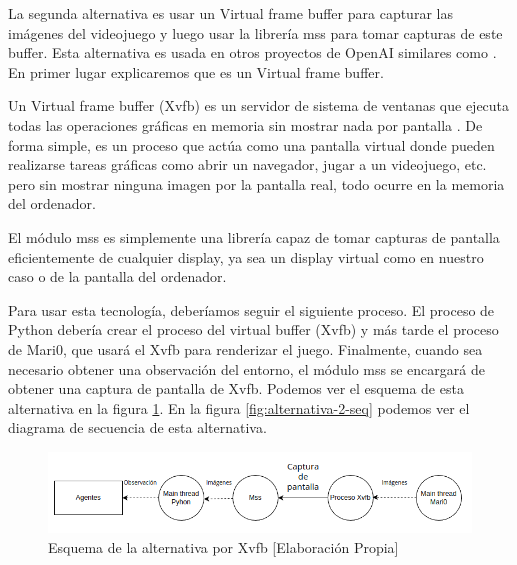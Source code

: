 La segunda alternativa es usar un Virtual frame buffer para capturar las imágenes del videojuego y luego usar la librería mss \cite {mss} para tomar capturas de este buffer. Esta alternativa es usada en otros proyectos de OpenAI similares como \cite {muphen}. En primer lugar explicaremos que es un Virtual frame buffer.

Un Virtual frame buffer (Xvfb) es un servidor de sistema de ventanas que ejecuta todas las operaciones gráficas en memoria sin mostrar nada por pantalla \cite {xvfb-wikipedia}. De forma simple, es un proceso que actúa como una pantalla virtual donde pueden realizarse tareas gráficas como abrir un navegador, jugar a un videojuego, etc. pero sin mostrar ninguna imagen por la pantalla real, todo ocurre en la memoria del ordenador.

El módulo mss es simplemente una librería capaz de tomar capturas de pantalla eficientemente de cualquier display, ya sea un display virtual como en nuestro caso o de la pantalla del ordenador.

Para usar esta tecnología, deberíamos seguir el siguiente proceso. El proceso de Python debería crear el proceso del virtual buffer (Xvfb) y más tarde el proceso de Mari0, que usará el Xvfb para renderizar el juego. Finalmente, cuando sea necesario obtener una observación del entorno, el módulo mss se encargará de obtener una captura de pantalla de Xvfb. Podemos ver el esquema de esta alternativa en la figura \ref{fig:alternativa-2-com}. En la figura \ref {fig:alternativa-2-seq} podemos ver el diagrama de secuencia de esta alternativa.

\begin{figure}[ht]
    \centering
    \includegraphics[width=1.0\textwidth]{img/Obsertavions-2.png}
    \caption{Esquema de la alternativa por Xvfb [Elaboración Propia]}
    \label{fig:alternativa-2-com}
\end{figure}

